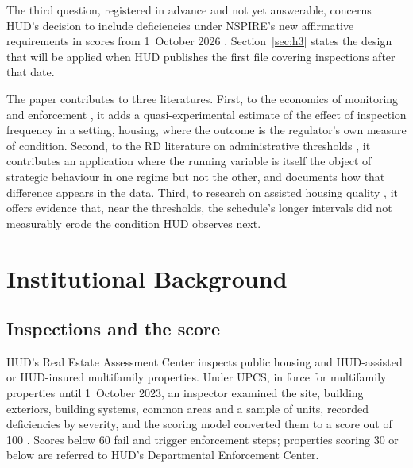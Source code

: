\documentclass[11pt,letterpaper]{article}
\begin{document}
The third question, registered in advance and not yet answerable, concerns HUD's decision to include deficiencies under NSPIRE's new affirmative requirements in scores from 1~October 2026 \citep{fr2026}. Section~\ref{sec:h3} states the design that will be applied when HUD publishes the first file covering inspections after that date.

The paper contributes to three literatures. First, to the economics of monitoring and enforcement \citep{gray2011, shimshack2014}, it adds a quasi-experimental estimate of the effect of inspection frequency in a setting, housing, where the outcome is the regulator's own measure of condition. Second, to the RD literature on administrative thresholds \citep{lee2010}, it contributes an application where the running variable is itself the object of strategic behaviour in one regime but not the other, and documents how that difference appears in the data. Third, to research on assisted housing quality \citep{gao2019}, it offers evidence that, near the thresholds, the schedule's longer intervals did not measurably erode the condition HUD observes next.

\section{Institutional Background}\label{sec:background}
\subsection{Inspections and the score}
HUD's Real Estate Assessment Center inspects public housing and HUD-assisted or HUD-insured multifamily properties. Under UPCS, in force for multifamily properties until 1~October 2023, an inspector examined the site, building exteriors, building systems, common areas and a sample of units, recorded deficiencies by severity, and the scoring model converted them to a score out of 100 \citep{fr2000}. Scores below 60 fail and trigger enforcement steps; properties scoring 30 or below are referred to HUD's Departmental Enforcement Center.
\end{document}
